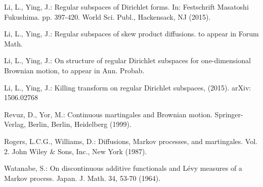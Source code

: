 \documentclass[a4paper]{amsart}
\theoremstyle{definition}
\theoremstyle{remark}
\numberwithin{equation}{section}
\begin{document}
\begin{thebibliography}{}
Li, L., Ying, J.: Regular subspaces of Dirichlet forms. In: Festschrift Masatoshi Fukushima. pp. 397-420. World Sci. Publ., Hackensack, NJ (2015).

Li, L., Ying, J.: Regular subspaces of skew product diffusions. to appear in Forum Math.

Li, L., Ying, J.: On structure of regular Dirichlet subspaces for one-dimensional Brownian motion, to appear in Ann. Probab.

Li, L., Ying, J.: Killing transform on regular Dirichlet subspaces, (2015). arXiv: 1506.02768

Revuz, D., Yor, M.: Continuous martingales and Brownian motion. Springer-Verlag, Berlin, Berlin, Heidelberg (1999).

Rogers, L.C.G., Williams, D.: Diffusions, Markov processes, and martingales. Vol. 2. John Wiley \& Sons, Inc., New York (1987).

Watanabe, S.: On discontinuous additive functionals and L\'evy measures of a Markov process. Japan. J. Math. 34, 53-70 (1964).
\end{thebibliography}
\end{document}
